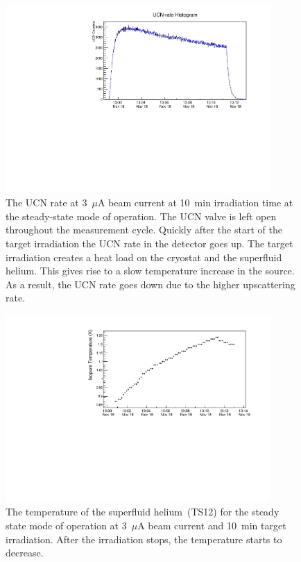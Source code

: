 \begin{figure}[h!]
  \centering
  \includegraphics[width=0.9\textwidth]{654_UCNRate.pdf}
  \caption[Steady-state UCN rate at 3~$\mu$A beam current]{The UCN
    rate at 3~$\mu$A beam current at 10~min irradiation time at the
    steady-state mode of operation. The UCN valve is left open
    throughout the measurement cycle. Quickly after the start of the
    target irradiation the UCN rate in the detector goes up. The
    target irradiation creates a heat load on the cryostat and the
    superfluid helium. This gives rise to a slow temperature increase
    in the source. As a result, the UCN rate goes down due to the
    higher upscattering rate.  }
  \label{fig:UCNRate_steadystate_highbeam}
\end{figure}

\begin{figure}[h!]
  \centering
  \includegraphics[width=0.9\textwidth]{UCNRate_temp.pdf}
  \caption[Superfluid helium temperature at 3~$\mu$A beam
  current~(steady-state mode)]{The temperature of the superfluid
    helium~(TS12) for the steady state mode of operation at 3~$\mu$A
    beam current and 10~min target irradiation. After the irradiation
    stops, the temperature starts to decrease. }
  \label{fig:UCNRate_temp}
\end{figure}


